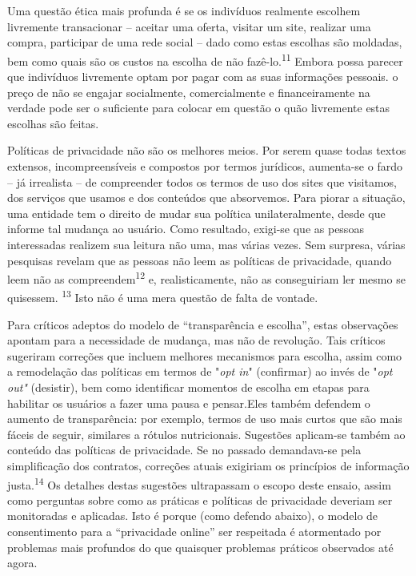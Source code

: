 Uma questão ética mais profunda é se os indivíduos realmente escolhem
livremente transacionar -- aceitar uma oferta, visitar um site, realizar
uma compra, participar de uma rede social -- dado como estas escolhas
são moldadas, bem como quais são os custos na escolha de não
fazê-lo.\textsuperscript{{11}} Embora possa parecer que indivíduos
livremente optam por pagar com as suas informações pessoais. o preço de
não se engajar socialmente, comercialmente e financeiramente na verdade
pode ser o suficiente para colocar em questão o quão livremente estas
escolhas são feitas.

Políticas de privacidade não são os melhores meios. Por serem quase
todas textos extensos, incompreensíveis e compostos por termos
jurídicos, aumenta-se o fardo -- já irrealista -- de compreender todos
os termos de uso dos sites que visitamos, dos serviços que usamos e dos
conteúdos que absorvemos. Para piorar a situação, uma entidade tem o
direito de mudar sua política unilateralmente, desde que informe tal
mudança ao usuário. Como resultado, exigi-se que as pessoas interessadas
realizem sua leitura não uma, mas várias vezes. Sem surpresa, várias
pesquisas revelam que as pessoas não leem as políticas de privacidade,
quando leem não as compreendem\textsuperscript{{12}} e, realisticamente,
não as conseguiriam ler mesmo se quisessem. \textsuperscript{{13}} Isto
não é uma mera questão de falta de vontade.

Para críticos adeptos do modelo de ``transparência e escolha'', estas
observações apontam para a necessidade de mudança, mas não de revolução.
Tais críticos sugeriram correções que incluem melhores mecanismos para
escolha, assim como a remodelação das políticas em termos de "\emph{opt
in}" (confirmar) ao invés de "\emph{opt out"} (desistir), bem como
identificar momentos de escolha em etapas para habilitar os usuários a
fazer uma pausa e pensar.Eles também defendem o aumento de
transparência: por exemplo, termos de uso mais curtos que são mais
fáceis de seguir, similares a rótulos nutricionais. Sugestões aplicam-se
também ao conteúdo das políticas de privacidade. Se no passado
demandava-se pela simplificação dos contratos, correções atuais
exigiriam os princípios de informação justa.\textsuperscript{{14}} Os
detalhes destas sugestões ultrapassam o escopo deste ensaio, assim como
perguntas sobre como as práticas e políticas de privacidade deveriam ser
monitoradas e aplicadas. Isto é porque (como defendo abaixo), o modelo
de consentimento para a ``privacidade online'' ser respeitada é
atormentado por problemas mais profundos do que quaisquer problemas
práticos observados até agora.

